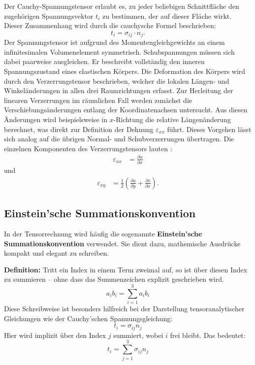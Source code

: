 Der Cauchy-Spannungstensor erlaubt es, zu jeder beliebigen Schnittfläche den zugehörigen Spannungsvektor $t_i$ zu bestimmen, der auf dieser Fläche wirkt.
Dieser Zusammenhang wird durch die cauchysche Formel beschrieben:
\begin{equation}
	t_i = 
	\sigma_{ij} \cdot n_j.
\end{equation}
Der Spannungstensor ist aufgrund des Momentengleichgewichts an einem infinitesimalen Volumenelement symmetrisch. 
Schubspannungen müssen sich dabei paarweise ausgleichen. 
Er beschreibt vollständig den inneren Spannungszustand eines elastischen Körpers.
Die Deformation des Körpers wird durch den Verzerrungstensor beschrieben, welcher die lokalen Längen- und Winkeländerungen in allen drei Raumrichtungen erfasst.
Zur Herleitung der linearen Verzerrungen im räumlichen Fall werden zunächst die Verschiebungsänderungen entlang der Koordinatenachsen untersucht. 
Aus diesen Änderungen wird beispielsweise in $x$-Richtung die relative Längenänderung berechnet, was direkt zur Definition der Dehnung $\varepsilon_{xx}$ führt. 
Dieses Vorgehen lässt sich analog auf die übrigen Normal- und Schubverzerrungen übertragen.
Die einzelnen Komponenten des Verzerrungstensors lauten \cite{elastomechanik:Technische_Mechanik_2:Elastostatik}:
\begin{align}
	\varepsilon_{xx} &=
	\frac{\partial u}{\partial x}
\end{align}
und
\begin{align}
	\varepsilon_{xy} &=
	\frac{1}{2} \left( \frac{\partial u}{\partial y} + \frac{\partial v}{\partial x} \right).
\end{align}

\subsection{Einstein’sche Summationskonvention}
In der Tensorrechnung wird häufig die sogenannte \textbf{Einstein’sche Summationskonvention} verwendet. Sie dient dazu, mathemische Ausdrücke kompakt und elegant zu schreiben.

\medskip
\textbf{Definition:} Tritt ein Index in einem Term zweimal auf, so ist über diesen Index zu summieren – ohne dass das Summenzeichen explizit geschrieben wird.
\begin{equation}
	a_i b_i = 
	\sum_{i=1}^3 a_i b_i
\end{equation}
Diese Schreibweise ist besonders hilfreich bei der Darstellung tensoranalytischer Gleichungen wie der Cauchy’schen Spannungsgleichung:
\begin{equation}
	t_i = 
	\sigma_{ij} n_j
\end{equation}
Hier wird implizit über den Index $j$ summiert, wobei $i$ frei bleibt. Das bedeutet:
\begin{equation}
	t_i = 
	\sum_{j=1}^{3} \sigma_{ij} n_j
\end{equation}



